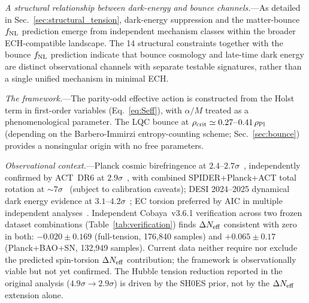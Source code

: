 \documentclass[aps,prd,twocolumn,superscriptaddress,showpacs,preprintnumbers,nofootinbib,longbibliography,floatfix]{revtex4-2}
\newcommand{\rhocrit}{\rho_{\rm crit}}
\newcommand{\rhoPl}{\rho_{\rm Pl}}
\newcommand{\Neff}{N_{\rm eff}}
\newcommand{\fnl}{f_{\rm NL}}
\begin{document}
\textit{A structural relationship between dark-energy and bounce channels.}---As detailed in Sec.~\ref{sec:structural_tension}, dark-energy suppression and the matter-bounce $\fnl$ prediction emerge from independent mechanism classes within the broader ECH-compatible landscape. The 14 structural constraints together with the bounce $\fnl$ prediction indicate that bounce cosmology and late-time dark energy are distinct observational channels with separate testable signatures, rather than a single unified mechanism in minimal ECH.

\textit{The framework.}---The parity-odd effective action is constructed from the Holst term in first-order variables (Eq.~\ref{eq:Seff}), with $\alpha/M$ treated as a phenomenological parameter. The LQC bounce at $\rhocrit\simeq 0.27$--$0.41\,\rhoPl$ (depending on the Barbero-Immirzi entropy-counting scheme; Sec.~\ref{sec:bounce}) provides a nonsingular origin with no free parameters.

\textit{Observational context.}---Planck cosmic birefringence at $2.4$--$2.7\sigma$~\cite{Minami2020,Eskilt2022}, independently confirmed by ACT~DR6 at $2.9\sigma$~\cite{DiegoPalazuelos2025}, with combined SPIDER+Planck+ACT total rotation at ${\sim}7\sigma$~\cite{SPIDER2025} (subject to calibration caveats); DESI 2024--2025 dynamical dark energy evidence at $3.1$--$4.2\sigma$~\cite{DESI2024,DESI2025DR2}; EC torsion preferred by AIC in multiple independent analyses~\cite{Liu2025,ECTorsionDESI2025}. Independent Cobaya~v3.6.1 verification across two frozen dataset combinations (Table~\ref{tab:verification}) finds $\Delta\Neff$ consistent with zero in both: $-0.020 \pm 0.169$ (full-tension, 176{,}840 samples) and $+0.065 \pm 0.17$ (Planck+BAO+SN, 132{,}949 samples). Current data neither require nor exclude the predicted spin-torsion $\Delta\Neff$ contribution; the framework is observationally viable but not yet confirmed. The Hubble tension reduction reported in the original analysis ($4.9\sigma \to 2.9\sigma$) is driven by the SH0ES prior, not by the $\Delta\Neff$ extension alone.
\end{document}
